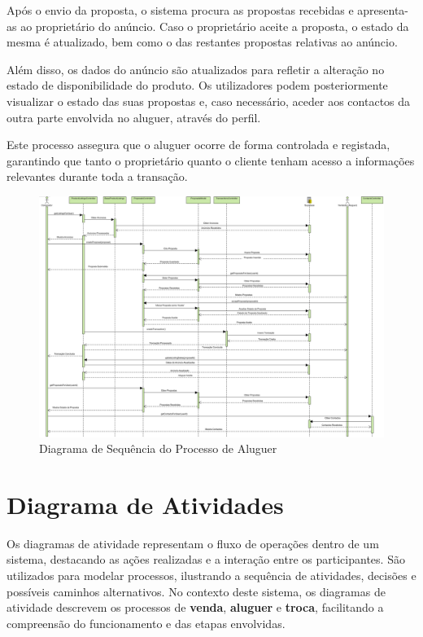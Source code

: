 \documentclass[a4paper, 12pt]{article} %
\begin{document}
Após o envio da proposta, o sistema procura as propostas recebidas e apresenta-as ao proprietário do anúncio. Caso o proprietário aceite a proposta, o estado da mesma é atualizado, bem como o das restantes propostas relativas ao anúncio.

Além disso, os dados do anúncio são atualizados para refletir a alteração no estado de disponibilidade do produto. Os utilizadores podem posteriormente visualizar o estado das suas propostas e, caso necessário, aceder aos contactos da outra parte envolvida no aluguer, através do perfil.

Este processo assegura que o aluguer ocorre de forma controlada e registada, garantindo que tanto o proprietário quanto o cliente tenham acesso a informações relevantes durante toda a transação.
\newpage
\begin{figure}[H]
	\centering
	\includegraphics[width=\textwidth,height=\textheight,keepaspectratio]{../images/sequence-diagram-rental.png}
	\caption{Diagrama de Sequência do Processo de Aluguer}
	\label{fig:diagrama_sequencia_aluguer}
\end{figure}
\newpage
\section{Diagrama de Atividades}


Os diagramas de atividade representam o fluxo de operações dentro de um sistema, destacando as ações realizadas e a interação entre os participantes. São utilizados para modelar processos, ilustrando a sequência de atividades, decisões e possíveis caminhos alternativos. No contexto deste sistema, os diagramas de atividade descrevem os processos de \textbf{venda}, \textbf{aluguer} e \textbf{troca}, facilitando a compreensão do funcionamento e das etapas envolvidas.
\end{document}
